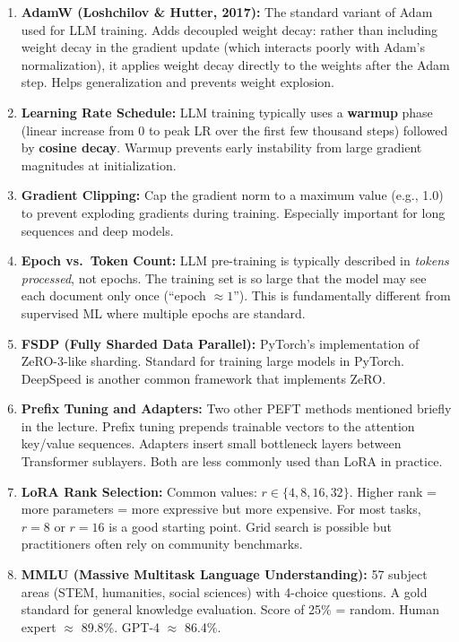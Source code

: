 \documentclass[11pt, a4paper]{article}
\begin{document}
\begin{enumerate}[leftmargin=2em]
  \item \textbf{AdamW (Loshchilov \& Hutter, 2017):} The standard variant of Adam used for LLM training. Adds decoupled weight decay: rather than including weight decay in the gradient update (which interacts poorly with Adam's normalization), it applies weight decay directly to the weights after the Adam step. Helps generalization and prevents weight explosion.

  \item \textbf{Learning Rate Schedule:} LLM training typically uses a \textbf{warmup} phase (linear increase from 0 to peak LR over the first few thousand steps) followed by \textbf{cosine decay}. Warmup prevents early instability from large gradient magnitudes at initialization.

  \item \textbf{Gradient Clipping:} Cap the gradient norm to a maximum value (e.g., 1.0) to prevent exploding gradients during training. Especially important for long sequences and deep models.

  \item \textbf{Epoch vs.\ Token Count:} LLM pre-training is typically described in \emph{tokens processed}, not epochs. The training set is so large that the model may see each document only once (``epoch $\approx 1$''). This is fundamentally different from supervised ML where multiple epochs are standard.

  \item \textbf{FSDP (Fully Sharded Data Parallel):} PyTorch's implementation of ZeRO-3-like sharding. Standard for training large models in PyTorch. DeepSpeed is another common framework that implements ZeRO.

  \item \textbf{Prefix Tuning and Adapters:} Two other PEFT methods mentioned briefly in the lecture. Prefix tuning prepends trainable vectors to the attention key/value sequences. Adapters insert small bottleneck layers between Transformer sublayers. Both are less commonly used than LoRA in practice.

  \item \textbf{LoRA Rank Selection:} Common values: $r \in \{4, 8, 16, 32\}$. Higher rank = more parameters = more expressive but more expensive. For most tasks, $r=8$ or $r=16$ is a good starting point. Grid search is possible but practitioners often rely on community benchmarks.

  \item \textbf{MMLU (Massive Multitask Language Understanding):} 57 subject areas (STEM, humanities, social sciences) with 4-choice questions. A gold standard for general knowledge evaluation. Score of 25\% = random. Human expert $\approx$ 89.8\%. GPT-4 $\approx$ 86.4\%.


\end{enumerate}
\end{document}
